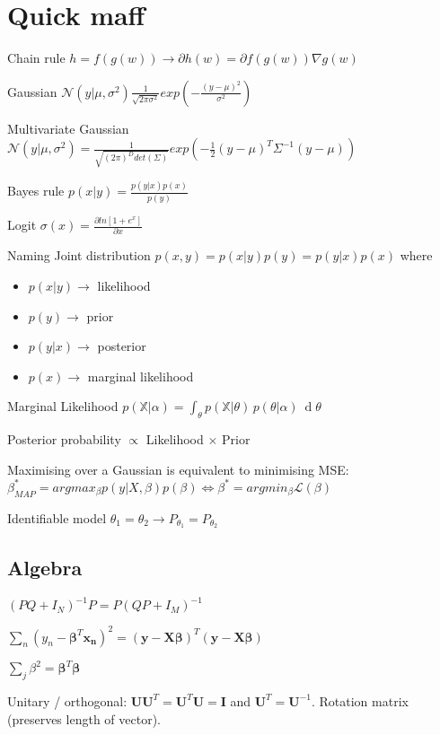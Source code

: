 \section{Quick maff}
Chain rule $h = f(g(w)) \rightarrow \partial h(w) = \partial f(g(w)) \nabla g(w)$

Gaussian $\mathcal{N}(y|\mu, \sigma^2) \frac{1}{\sqrt{2\pi \sigma^2}} exp(-\frac{(y-\mu)^2}{\sigma^2})$

Multivariate Gaussian $\mathcal{N}(y|\mu, \sigma^2) = \frac{1}{\sqrt{(2\pi)^D det(\Sigma)}} exp(-\frac{1}{2} (y-\mu)^T \Sigma^{-1} (y-\mu))$

Bayes rule $p(x|y) = \frac{p(y|x) p(x)}{p(y)}$

Logit $\sigma(x) = \frac{\partial ln[1+e^x]}{\partial x}$

Naming
Joint distribution $p(x,y) = p(x|y)p(y)=p(y|x)p(x)$ where
\begin{itemize}
\item $p(x|y) \rightarrow$ likelihood 
\item $p(y) \rightarrow$ prior
\item $p(y|x) \rightarrow$ posterior
\item $p(x) \rightarrow$ marginal likelihood
\end{itemize}

Marginal Likelihood \newline $p({\mathbb  {X}}|\alpha )=\int _{\theta }p({\mathbb  {X}}|\theta )\,p(\theta |\alpha )\ \operatorname {d}\!\theta $

Posterior probability $\propto$ Likelihood $\times$ Prior

Maximising over a Gaussian is equivalent to minimising MSE: $\beta_{MAP}^* = arg max_{\beta} p(y|X,\beta)p(\beta) \Leftrightarrow \beta^* = arg min_{\beta} \mathcal{L}(\beta)$

Identifiable model $\theta_1 = \theta_2 \rightarrow P_{\theta_1} = P_{\theta_2}$

\subsection{Algebra}
$(PQ + I_N)^{-1} P = P (QP + I_M)^{-1}$

$\sum_n (y_{n} -\mathbf{\beta}^T\mathbf{x_n})^2 = (\mathbf{y} - \mathbf{X}\mathbf{\beta})^T(\mathbf{y} - \mathbf{X}\mathbf{\beta})$

$\sum_j \beta^2 = \mathbf{\beta}^T \mathbf{\beta}$

Unitary / orthogonal: $\mathbf{U}\mathbf{U}^T=\mathbf{U}^T\mathbf{U} = \mathbf{I}$ and $\mathbf{U}^T = \mathbf{U}^{-1}$. Rotation matrix (preserves length of vector).
